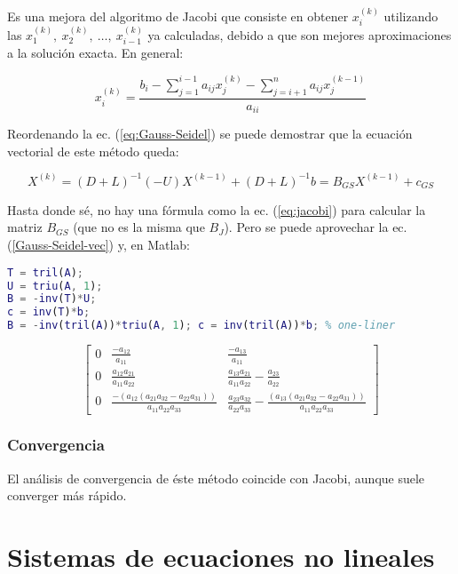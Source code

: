 \documentclass{article}
\begin{document}
Es una mejora del algoritmo de Jacobi que consiste en obtener $x_i^{(k)}$ utilizando las $x_1^{(k)},\ x_2^{(k)},\ \dots,\ x_{i-1}^{(k)}$ ya calculadas, debido a que son mejores aproximaciones a la solución exacta. En general:

\begin{equation}\label{eq:Gauss-Seidel}
    x_i^{(k)} = \frac{b_i - \sum_{j=1}^{i-1} a_{ij}x_j^{(k)} - \sum_{j=i+1}^n a_{ij}x_j^{(k-1)}}{a_{ii}}
\end{equation}

Reordenando la ec. (\ref{eq:Gauss-Seidel}) se puede demostrar que la ecuación vectorial de este método queda:

\begin{equation}\label{Gauss-Seidel-vec}
    X^{(k)} = (D+L)^{-1}(-U)X^{(k-1)} + (D+L)^{-1}b = B_{GS}X^{(k-1)} + c_{GS}
\end{equation}

Hasta donde sé, no hay una fórmula como la ec. (\ref{eq:jacobi}) para calcular la matriz $B_{GS}$ (que no es la misma que $B_J$). Pero se puede aprovechar la ec. (\ref{Gauss-Seidel-vec}) y, en Matlab:

\begin{lstlisting}[language=Matlab]
T = tril(A);
U = triu(A, 1);
B = -inv(T)*U;
c = inv(T)*b;
B = -inv(tril(A))*triu(A, 1); c = inv(tril(A))*b; % one-liner
\end{lstlisting}

\begin{equation}
\begin{bmatrix}
0 & \frac{-a_{12}}{a_{11}} & \frac{-a_{13}}{a_{11}} \\
0 & \frac{a_{12}a_{21}}{a_{11}a_{22}} & \frac{a_{13}a_{21}}{a_{11}a_{22}} - \frac{a_{23}}{a_{22}} \\
0 & \frac{-(a_{12}(a_{21}a_{32} - a_{22}a_{31}))}{a_{11}a_{22}a_{33}} & \frac{a_{23}a_{32}}{a_{22}a_{33}} - \frac{(a_{13}(a_{21}a_{32} - a_{22}a_{31}))}{a_{11}a_{22}a_{33}}
\end{bmatrix}
\end{equation}

\subsubsection{Convergencia}

El análisis de convergencia de éste método coincide con Jacobi, aunque suele converger más rápido.

\section{Sistemas de ecuaciones no lineales}
\end{document}
